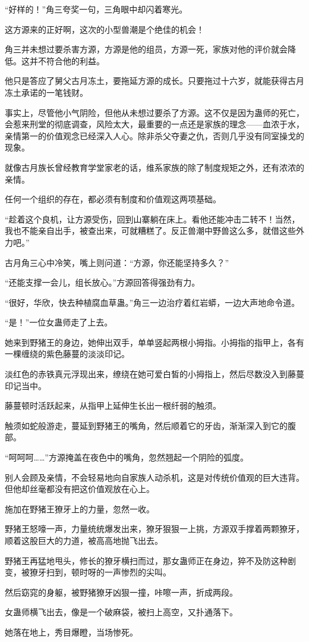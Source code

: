 \begin{this_body}
“好样的！”角三夸奖一句，三角眼中却闪着寒光。

这方源来的正好啊，这次的小型兽潮是个绝佳的机会！

角三并未想过要杀害方源，方源是他的组员，方源一死，家族对他的评价就会降低。这并不符合他的利益。

他只是答应了舅父古月冻土，要拖延方源的成长。只要拖过十六岁，就能获得古月冻土承诺的一笔钱财。

事实上，尽管他小气阴险，但他从未想过要杀了方源。这不仅是因为蛊师的死亡，会惹来刑堂的彻底调查，风险太大，最重要的一点还是家族的理念——血浓于水，亲情第一的价值观念已经深入人心。除非杀父夺妻之仇，否则几乎没有同室操戈的现象。

就像古月族长曾经教育学堂家老的话，维系家族的除了制度规矩之外，还有浓浓的亲情。

任何一个组织的存在，都必须有制度和价值观这两项基础。

“趁着这个良机，让方源受伤，回到山寨躺在床上。看他还能冲击二转不！当然，我也不能亲自出手，被查出来，可就糟糕了。反正兽潮中野兽这么多，就借这些外力吧。”

古月角三心中冷笑，嘴上则问道：“方源，你还能坚持多久？”

“还能支撑一会儿，组长放心。”方源回答得强劲有力。

“很好，华欣，快去种植腐血草蛊。”角三一边治疗着红岩蟒，一边大声地命令道。

“是！”一位女蛊师走了上去。

她来到野猪王的身边，她伸出双手，单单竖起两根小拇指。小拇指的指甲上，各有一棵缠绕的紫色藤蔓的淡淡印记。

淡红色的赤铁真元浮现出来，缭绕在她可爱白皙的小拇指上，然后尽数没入到藤蔓印记当中。

藤蔓顿时活跃起来，从指甲上延伸生长出一根纤弱的触须。

触须如蛇般游走，蔓延到野猪王的嘴角，然后顺着它的牙齿，渐渐深入到它的腹部。

“呵呵呵……”方源掩盖在夜色中的嘴角，忽然翘起一个阴险的弧度。

别人会顾及亲情，不会轻易地向自家族人动杀机，这是对传统价值观的巨大违背。但他却丝毫都没有把这价值观放在心上。

施加在野猪王獠牙上的力量，忽然一收。

野猪王怒嚎一声，力量统统爆发出来，獠牙狠狠一上挑，方源双手撑着两颗獠牙，顺着这股巨大的力道，被高高地抛飞出去。

野猪王再猛地甩头，修长的獠牙横扫而过，那女蛊师正在身边，猝不及防这种剧变，被獠牙扫到，顿时呀的一声惨烈的尖叫。

然后窈窕的身躯，被野猪獠牙凶狠一撞，咔嚓一声，折成两段。

女蛊师横飞出去，像是一个破麻袋，被扫上高空，又扑通落下。

她落在地上，秀目爆瞪，当场惨死。

\end{this_body}


